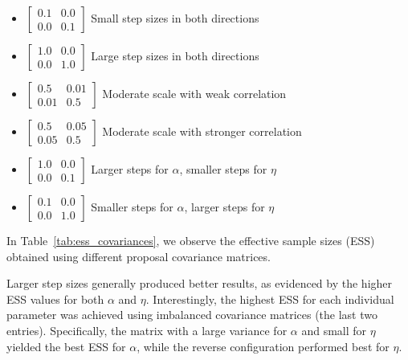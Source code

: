 \documentclass[9pt]{IEEEtran}
\begin{document}
\begin{itemize}
  \item 
  \(
  \begin{bmatrix}
    0.1 & 0.0 \\
    0.0 & 0.1
  \end{bmatrix}
  \) 
  \hfill Small step sizes in both directions

  \item 
  \(
  \begin{bmatrix}
    1.0 & 0.0 \\
    0.0 & 1.0
  \end{bmatrix}
  \) 
  \hfill Large step sizes in both directions

  \item 
  \(
  \begin{bmatrix}
    0.5 & 0.01 \\
    0.01 & 0.5
  \end{bmatrix}
  \) 
  \hfill Moderate scale with weak correlation

  \item 
  \(
  \begin{bmatrix}
    0.5 & 0.05 \\
    0.05 & 0.5
  \end{bmatrix}
  \) 
  \hfill Moderate scale with stronger correlation

  \item 
  \(
  \begin{bmatrix}
    1.0 & 0.0 \\
    0.0 & 0.1
  \end{bmatrix}
  \) 
  \hfill Larger steps for \( \alpha \), smaller steps for \( \eta \)

  \item 
  \(
  \begin{bmatrix}
    0.1 & 0.0 \\
    0.0 & 1.0
  \end{bmatrix}
  \) 
  \hfill Smaller steps for \( \alpha \), larger steps for \( \eta \)
\end{itemize}

In Table~\ref{tab:ess_covariances}, we observe the effective sample sizes (ESS) obtained using different proposal covariance matrices. 

Larger step sizes generally produced better results, as evidenced by the higher ESS values for both $\alpha$ and $\eta$. Interestingly, the highest ESS for each individual parameter was achieved using imbalanced covariance matrices (the last two entries). Specifically, the matrix with a large variance for $\alpha$ and small for $\eta$ yielded the best ESS for $\alpha$, while the reverse configuration performed best for $\eta$.
\end{document}
